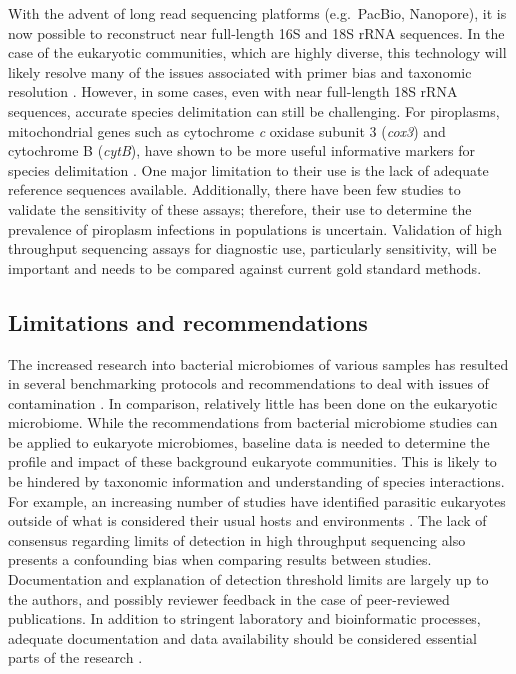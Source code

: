 \documentclass[a4paper, nobind]{templates/ociamthesis}
\begin{document}
With the advent of long read sequencing platforms (e.g.~PacBio, Nanopore), it is now possible to reconstruct near full-length 16S and 18S rRNA sequences.
In the case of the eukaryotic communities, which are highly diverse, this technology will likely resolve many of the issues associated with primer bias and taxonomic resolution \autocite{jamyLongReadMetabarcoding2020}.
However, in some cases, even with near full-length 18S rRNA sequences, accurate species delimitation can still be challenging.
For piroplasms, mitochondrial genes such as cytochrome \emph{c} oxidase subunit 3 (\emph{cox3}) and cytochrome B (\emph{cytB}), have shown to be more useful informative markers for species delimitation \autocite{schreegMitochondrialGenomeSequences2016,barbosaSequenceAnalysesMitochondrial2019}.
One major limitation to their use is the lack of adequate reference sequences available.
Additionally, there have been few studies to validate the sensitivity of these assays; therefore, their use to determine the prevalence of piroplasm infections in populations is uncertain.
Validation of high throughput sequencing assays for diagnostic use, particularly sensitivity, will be important and needs to be compared against current gold standard methods.

\hypertarget{limitations-and-recommendations-1}{%
\subsection{Limitations and recommendations}\label{limitations-and-recommendations-1}}

The increased research into bacterial microbiomes of various samples has resulted in several benchmarking protocols and recommendations to deal with issues of contamination \autocite{salterReagentLaboratoryContamination2014,eisenhoferContaminationLowMicrobial2019,hoffmannAnalysisTickSurface2020}.
In comparison, relatively little has been done on the eukaryotic microbiome.
While the recommendations from bacterial microbiome studies can be applied to eukaryote microbiomes, baseline data is needed to determine the profile and impact of these background eukaryote communities.
This is likely to be hindered by taxonomic information and understanding of species interactions.
For example, an increasing number of studies have identified parasitic eukaryotes outside of what is considered their usual hosts and environments \autocite{liDetectionHumanIntestinal2020}.
The lack of consensus regarding limits of detection in high throughput sequencing also presents a confounding bias when comparing results between studies.
Documentation and explanation of detection threshold limits are largely up to the authors, and possibly reviewer feedback in the case of peer-reviewed publications.
In addition to stringent laboratory and bioinformatic processes, adequate documentation and data availability should be considered essential parts of the research \autocite{kumuthiniTenSimpleRules2020}.
\end{document}
